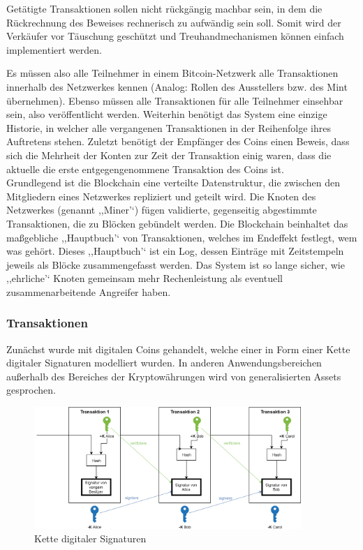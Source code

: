     Getätigte Transaktionen sollen nicht rückgängig machbar sein, in dem die Rückrechnung des Beweises rechnerisch zu aufwändig sein soll\cite{Nakamoto2008}.
    Somit wird der Verkäufer vor Täuschung geschützt und Treuhandmechanismen können einfach implementiert werden\cite{Nakamoto2008}.  
    
    
    Es müssen also alle Teilnehmer in einem Bitcoin-Netzwerk alle Transaktionen innerhalb des Netzwerkes kennen (Analog: Rollen des Ausstellers bzw. des Mint übernehmen).
    Ebenso müssen alle Transaktionen für alle Teilnehmer einsehbar sein, also veröffentlicht werden.
    Weiterhin benötigt das System eine einzige Historie, in welcher alle vergangenen Transaktionen in der Reihenfolge ihres Auftretens stehen.
    Zuletzt benötigt der Empfänger des Coins einen Beweis, dass sich die Mehrheit der Konten zur Zeit der Transaktion einig waren, dass die aktuelle die erste entgegengenommene Transaktion des Coins ist. 
    \cite{Nakamoto2008}
    \medskip\\
    
    \noindent Grundlegend ist die Blockchain eine verteilte Datenstruktur, die zwischen den Mitgliedern eines Netzwerkes repliziert und geteilt wird\cite{Christidis2016}.
    Die Knoten des Netzwerkes (genannt ,,Miner'`) fügen validierte, gegenseitig abgestimmte Transaktionen, die zu Blöcken gebündelt werden.
    Die Blockchain beinhaltet das maßgebliche ,,Hauptbuch'` von Transaktionen, welches im Endeffekt festlegt, wem was gehört.
    Dieses ,,Hauptbuch'` ist ein Log, dessen Einträge mit Zeitstempeln jeweils als Blöcke zusammengefasst werden.
    Das System ist so lange sicher, wie ,,ehrliche'` Knoten gemeinsam mehr Rechenleistung als eventuell zusammenarbeitende Angreifer haben\cite{Nakamoto2008}.
    
    \subsubsection{Transaktionen}
    \label{sec:sota_blockchain_trx}
	    Zunächst wurde mit digitalen Coins gehandelt, welche einer in Form einer Kette digitaler Signaturen modelliert wurden\cite{Nakamoto2008}.
	    In anderen Anwendungsbereichen außerhalb des Bereiches der Kryptowährungen wird von generalisierten Assets gesprochen.
	    \begin{figure}[H]
	    	\centering
	    	\includegraphics[width=0.9\textwidth]{graphics/transaction.png}
	    	\caption{Kette digitaler Signaturen}
	    	\label{fig:txio}
	    \end{figure}
    

